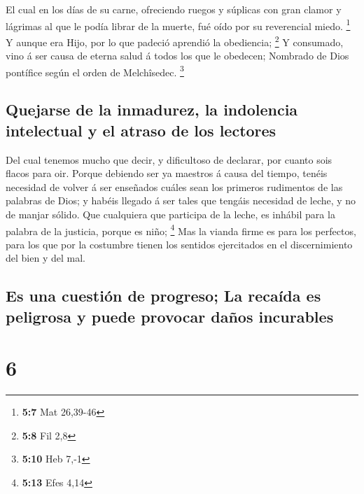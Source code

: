  El cual en los días de su carne, ofreciendo ruegos y
súplicas con gran clamor y lágrimas al que le podía librar de la muerte,
fué oído por su reverencial miedo. \footnote{\textbf{5:7} Mat 26,39-46}
 Y aunque era Hijo, por lo que padeció aprendió la
obediencia; \footnote{\textbf{5:8} Fil 2,8}  Y consumado,
vino á ser causa de eterna salud á todos los que le obedecen;
 Nombrado de Dios pontífice según el orden de
Melchîsedec. \footnote{\textbf{5:10} Heb 7,-1}

\hypertarget{quejarse-de-la-inmadurez-la-indolencia-intelectual-y-el-atraso-de-los-lectores}{%
\subsection{Quejarse de la inmadurez, la indolencia intelectual y el
atraso de los
lectores}\label{quejarse-de-la-inmadurez-la-indolencia-intelectual-y-el-atraso-de-los-lectores}}

 Del cual tenemos mucho que decir, y dificultoso de
declarar, por cuanto sois flacos para oir.  Porque
debiendo ser ya maestros á causa del tiempo, tenéis necesidad de volver
á ser enseñados cuáles sean los primeros rudimentos de las palabras de
Dios; y habéis llegado á ser tales que tengáis necesidad de leche, y no
de manjar sólido.  Que cualquiera que participa de la
leche, es inhábil para la palabra de la justicia, porque es niño;
\footnote{\textbf{5:13} Efes 4,14}  Mas la vianda firme
es para los perfectos, para los que por la costumbre tienen los sentidos
ejercitados en el discernimiento del bien y del mal.

\hypertarget{es-una-cuestiuxf3n-de-progreso-la-recauxedda-es-peligrosa-y-puede-provocar-dauxf1os-incurables}{%
\subsection{Es una cuestión de progreso; La recaída es peligrosa y puede
provocar daños
incurables}\label{es-una-cuestiuxf3n-de-progreso-la-recauxedda-es-peligrosa-y-puede-provocar-dauxf1os-incurables}}

\hypertarget{section-5}{%
\section{6}\label{section-5}}


